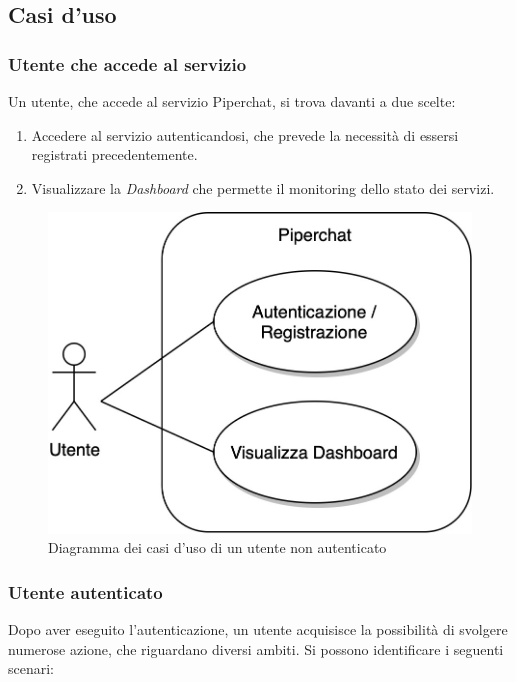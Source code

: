 %
%
%
\newpage
\subsection{Casi d'uso}

%
%
%
\subsubsection{Utente che accede al servizio}

Un utente, che accede al servizio Piperchat, si trova davanti a due scelte:

\begin{enumerate}
    \item Accedere al servizio autenticandosi, che prevede la necessità di essersi registrati precedentemente.
    \item Visualizzare la \emph{Dashboard} che permette il monitoring dello stato dei servizi.
\end{enumerate}

\begin{figure}[H]
    \centering
    \includegraphics[width=0.6\linewidth]{sections/01-goal/img/use-cases/piperchat-Casi d'uso-1.jpg}
    \caption{Diagramma dei casi d'uso di un utente non autenticato}
\end{figure}

%
%
%
\subsubsection{Utente autenticato}

Dopo aver eseguito l'autenticazione, un utente acquisisce la possibilità di svolgere numerose azione, che riguardano diversi ambiti.
%
Si possono identificare i seguenti scenari:

